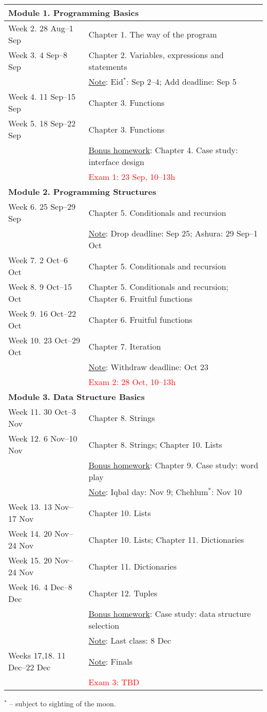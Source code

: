 \documentclass[a4paper]{article}
\begin{document}
\noindent\begin{tabularx}{\textwidth}{lp{}}
  \hline
  \multicolumn{2}{l}{\bf Module 1. Programming Basics}\\\hline
  Week 2. 28 Aug--1 Sep & Chapter 1. The way of the program\\
  Week 3. 4 Sep--8 Sep & Chapter 2. Variables, expressions and statements\\
  & \underline{Note}: Eid$^*$: Sep 2--4; Add deadline: Sep 5\\
  Week 4. 11 Sep--15 Sep & Chapter 3. Functions\\
  Week 5. 18 Sep--22 Sep & Chapter 3. Functions\\
  & \underline{Bonus homework}: Chapter 4. Case study: interface design\\
  & \textcolor{red}{Exam 1: 23 Sep, 10--13h}\\\hline
  \multicolumn{2}{l}{\bf Module 2. Programming Structures}\\\hline
  Week 6. 25 Sep--29 Sep & Chapter 5. Conditionals and recursion\\
  & \underline{Note}: Drop deadline: Sep 25; Ashura: 29 Sep--1 Oct\\
  Week 7. 2 Oct--6 Oct & Chapter 5. Conditionals and recursion\\
  Week 8. 9 Oct--15 Oct & Chapter 5. Conditionals and recursion; Chapter 6. Fruitful functions\\
  Week 9. 16 Oct--22 Oct & Chapter 6. Fruitful functions\\
  Week 10. 23 Oct--29 Oct & Chapter 7. Iteration\\
  & \underline{Note}: Withdraw deadline: Oct 23\\
  & \textcolor{red}{Exam 2: 28 Oct, 10--13h}\\\hline
  \multicolumn{2}{l}{\bf Module 3. Data Structure Basics}\\\hline
  Week 11. 30 Oct--3 Nov & Chapter 8. Strings\\
  Week 12. 6 Nov--10 Nov & Chapter 8. Strings; Chapter 10. Lists\\
  & \underline{Bonus homework}: Chapter 9. Case study: word play\\
  & \underline{Note}: Iqbal day: Nov 9; Chehlum$^*$: Nov 10\\
  Week 13. 13 Nov--17 Nov & Chapter 10. Lists\\
  Week 14. 20 Nov--24 Nov & Chapter 10. Lists; Chapter 11. Dictionaries\\
  Week 15. 20 Nov--24 Nov & Chapter 11. Dictionaries \\ 
  Week 16. 4 Dec--8 Dec & Chapter 12. Tuples\\
  & \underline{Bonus homework}: Case study: data structure selection\\
  & \underline{Note}: Last class: 8 Dec\\
  Weeks 17,18. 11 Dec--22 Dec & \underline{Note}: Finals \\
  & \textcolor{red}{Exam 3: TBD}\\\hline
\end{tabularx}
$^*$ -- subject to sighting of the moon.
\end{document}
